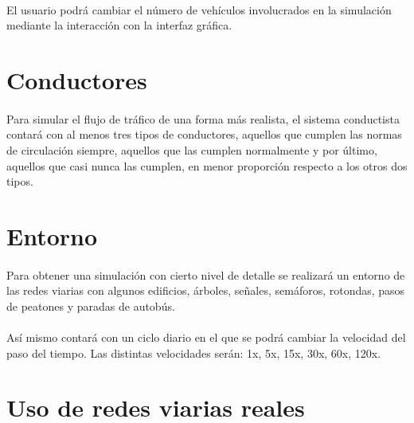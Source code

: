 	\paragraph{}
	El usuario podrá cambiar el número de vehículos involucrados en la simulación mediante la interacción con la interfaz gráfica.
	
\section{Conductores}

	\paragraph{}
	Para simular el flujo de tráfico de una forma más realista, el sistema conductista contará con al menos tres tipos de conductores, aquellos que cumplen las normas de circulación siempre, aquellos que las cumplen normalmente y por último, aquellos que casi nunca las cumplen, en menor proporción respecto a los otros dos tipos.
	
\section{Entorno}
	
	\paragraph{}
	Para obtener una simulación con cierto nivel de detalle se realizará un entorno de las redes viarias con algunos edificios, árboles, señales, semáforos, rotondas, pasos de peatones y paradas de autobús.
	
	\paragraph{}
	Así mismo contará con un ciclo diario en el que se podrá cambiar la velocidad del paso del tiempo. Las distintas velocidades serán: 1x, 5x, 15x, 30x, 60x, 120x.
	
\section{Uso de redes viarias reales}

	\paragraph{}
	